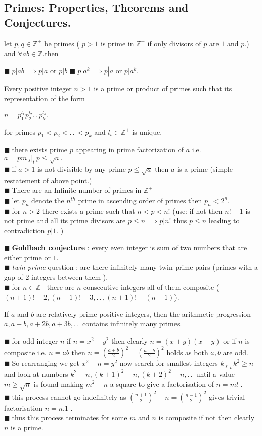\documentclass[11pt]{extarticle}
\newcommand{\Z}{\mathbb{Z}}
\newcommand{\w}[1]{\text{#1}}
\newcommand{\ck}{.\,.\,}
\newcommand{\snote}[1]{{\footnotesize(#1)}}
\newcommand{\st}{\,{}_{s}|_t\,}
\newcommand{\tbx}[2][]{
\begin{tcolorbox}[enhanced,breakable,size=small,colback=black!2!white,title={#1},arc is angular, arc=1.5mm,
	drop fuzzy shadow]
	#2
\end{tcolorbox}
}
\newcommand{\y}{$\blacksquare\;$}
\begin{document}
\begin{multicols}{2}
   \section{Primes: Properties, Theorems and Conjectures. }
   let $ p,q \in \Z^+$ be primes \snote{ $ p>1 $ is prime in $ \Z^+ $ if only divisors of $ p $ are $ 1 $ and $ p. $}  and $\forall ab\in \Z.$then
   \tbx{
   	\y $ p|ab \implies p|a\w{ or } p|b $ 
   	\y $ p|a^k\implies p|a \w{ or } p|a^k.$
   }
   \tbx[Fundamental Theorem of Arithmetic]{ Every positive integer $ n>1 $ is a prime or product of primes such that its representation of the form 
   	\begin{center}
   		$ n=p_1^{l_1}p_2^{l_2}\ck p_k^{l_k} .$
   	\end{center} for primes $ p_1<p_2<\ck <p_k $ and $ l_i\in \Z^+  $   is unique.}
   \tbx{ 
   	\y  there exists prime $ p $ appearing in prime factorization of $ a $ i.e. $ a=pm \st p\leq \sqrt{a}. $ \\
   	\y if $ a>1 $ is not divisible by any prime $ p\leq \sqrt{a} $ then $ a $ is a prime \snote{simple restatement of above point.}\\
   	\y There are an Infinite number of primes in $ \Z^+ $ \\
   	\y let $ p_n $ denote the $ n^{th} $ prime in ascending order of primes then $ p_n<2^n. $\\
   	\y for $ n>2 $ there exists a prime such that $ n<p<n! $ \snote{use: if not then $ n!-1 $ is not prime and all its prime divisors are $ p\leq n \implies p|n! $ thus $ p\leq n $ leading to contradiction $ p|1. $ }\\
   }
   \tbx{ \y \textbf{Goldbach conjecture} : every even integer is sum of two numbers that are either prime or $ 1 $.\\
   	\y \textit{twin prime} question : are there infinitely many twin prime pairs \snote{primes with a gap of $ 2 $ integers between them }.\\
   	\y for $ n\in \Z^+ $ there are $ n $ consecutive integers all of them composite \snote{$(n + 1)! + 2, (n + 1)! + 3, \ck , ( n + 1)! + ( n + 1)  $}.
   	  }
   	  \tbx[Dirichlet theorem]{  If $a$ and $b$ are relatively prime positive integers, then the
   	  	arithmetic progression
   	  	$a, a+ b, a+ 2b, a+ 3b, \ck$
   	  	contains infinitely many primes. }
   
   \tbx[Fermat Kraitchik Factorisation method]{ 
   	\y for odd integer $ n $ if $ n=x^2-y^2 $ then clearly $ n=(x+y)(x-y) $ or if $ n $ is composite i.e. $n=ab $ then $ n=(\frac{ a+b }{2} )^2-(\frac{ a-b }{2} )^2 $ holds  as both $ a,b $ are odd.\\
   	\y So rearranging we get $ x^2-n=y^2 $ now search for smallest integers $ k \st k^2\geq n$ and look at numbers $ k^2-n, (k+1)^2-n,(k+2)^2-n,\ck $ until a value $ m\geq\sqrt{n} $ is found making $ m^2-n $ a square to give a factorisation of $ n=ml $ .\\
   	\y this process cannot go indefinitely as $  (\frac{ n+1 }{2} )^2-n=(\frac{ n-1 }{2}  )^2  $ gives trivial factorisation $ n=n.1 $ .\\
   	\y thus this process terminates for some $ m $ and $ n $ is composite if not then clearly $ n $ is a prime.   }

\end{multicols}
\end{document}

